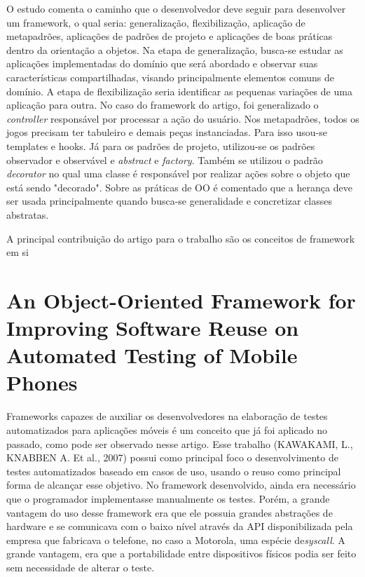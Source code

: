 \documentclass[
    12pt,       %
    openright,      %
    twoside,      %
    a4paper,      %
    english,      %
    french,       %
    spanish,      %
    brazil,       %
    ]{abntex2}
\begin{document}
      O estudo comenta o caminho que o desenvolvedor deve seguir para desenvolver um
      framework, o qual seria: generalização, flexibilização, aplicação de metapadrões, aplicações de padrões
      de projeto e aplicações de boas práticas dentro da orientação a objetos.
      Na etapa de generalização, busca-se estudar as aplicações implementadas do domínio que será abordado
      e observar suas características compartilhadas, visando principalmente elementos comuns de domínio. A
      etapa de flexibilização seria identificar as pequenas variações de uma aplicação para outra. No caso do
      framework do artigo, foi generalizado o \textit{controller} responsável por processar a ação do usuário.
      Nos metapadrões, todos os jogos precisam ter tabuleiro e demais peças instanciadas. Para isso usou-se
      templates e hooks. Já para os padrões de projeto, utilizou-se os padrões observador e observável e
      \textit{abstract} e \textit{factory}. Também se utilizou o padrão \textit{decorator} no qual uma
      classe é responsável por realizar ações sobre o objeto que está sendo "decorado". Sobre as práticas
      de OO é comentado que a herança deve ser usada principalmente quando busca-se generalidade e concretizar classes abstratas.

      A principal contribuição do artigo para o trabalho são os conceitos de framework em si

    \section{An Object-Oriented Framework for Improving Software Reuse on Automated Testing of Mobile Phones}
      Frameworks capazes de auxiliar os desenvolvedores na elaboração de testes automatizados para aplicações
      móveis é um conceito que já foi aplicado no passado, como pode ser observado nesse artigo. Esse
      trabalho (KAWAKAMI, L., KNABBEN A. Et al., 2007) possui como principal foco o desenvolvimento de testes
      automatizados baseado em casos de uso, usando o reuso como principal forma de alcançar esse objetivo.
      No framework desenvolvido, ainda era necessário que o programador implementasse manualmente os testes.
      Porém, a grande vantagem do uso desse framework era que ele possuia grandes abstrações de hardware
      e se comunicava com o baixo nível através da API disponibilizada pela empresa que fabricava o
      telefone, no caso a Motorola, uma espécie de\textit{syscall}. A grande vantagem, era que a portabilidade
      entre dispositivos físicos podia ser feito sem necessidade de alterar o teste.
\end{document}
